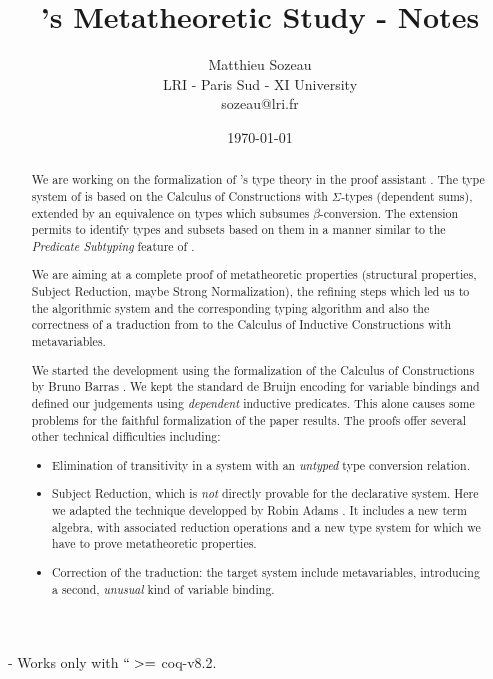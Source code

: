\documentclass{article}
\title{\Russell's Metatheoretic Study - Notes}
\date{\today}
\author{Matthieu Sozeau \\
  LRI - Paris Sud - XI University \\
  sozeau@lri.fr}
\begin{document}
\maketitle
\begin{abstract}
We are working on the formalization of \Russell{}'s type theory in the
\Coq{} proof assistant \cite{sozeau:coq/Russell/meta}.  The type system
of \Russell{} is based on the Calculus of Constructions with
$\Sigma$-types (dependent sums), extended by an equivalence on types
which subsumes $\beta$-conversion. The extension permits to identify
types and subsets based on them in a manner similar to the
\emph{Predicate Subtyping} feature of \PVS{}.

We are aiming at a complete proof of \Russell{} metatheoretic properties
(structural properties, Subject Reduction, maybe Strong Normalization),
the refining steps which led us to the algorithmic system and the
corresponding typing algorithm and also the correctness of a traduction
from \Russell{} to the Calculus of Inductive Constructions with
metavariables.

We started the development using the formalization of the Calculus of
Constructions by Bruno Barras \cite{Barras96a}.  We kept the standard de
Bruijn encoding for variable bindings and defined our judgements using
\emph{dependent} inductive predicates.  This alone causes some problems
for the faithful formalization of the paper results.  The proofs offer
several other technical difficulties including:
\begin{itemize}
\item Elimination of transitivity in a system with an \emph{untyped} type
  conversion relation.

\item Subject Reduction, which is \emph{not} directly provable for the
  declarative system. Here we adapted the technique developped by
  Robin Adams \cite{adams:PTSEQ}. It includes a new term algebra, with
  associated reduction operations and a new type system
  for which we have to prove metatheoretic properties.

\item Correction of the traduction: the target system include
  metavariables, introducing a second, \emph{unusual} kind of variable binding.
\end{itemize}
\end{abstract}

- Works only with $``>=$ coq-v8.2.
\end{document}
